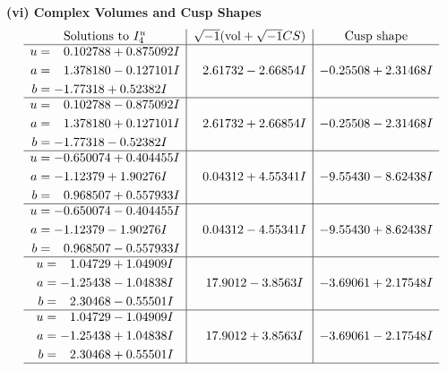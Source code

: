 \documentclass[1p]{elsarticle_modified}
\theoremstyle{definition}
\newcommand{\I}{\sqrt{-1}}
\begin{document}
\newpage\flushleft \textbf{(vi) Complex Volumes and Cusp Shapes}
$$\begin{array}{c|c|c}  
\text{Solutions to }I^u_{4}& \I (\text{vol} + \sqrt{-1}CS) & \text{Cusp shape}\\
 \hline 
\begin{aligned}
u &= \phantom{-}0.102788 + 0.875092 I \\
a &= \phantom{-}1.378180 - 0.127101 I \\
b &= -1.77318 + 0.52382 I\end{aligned}
 & \phantom{-}2.61732 - 2.66854 I & -0.25508 + 2.31468 I \\ \hline\begin{aligned}
u &= \phantom{-}0.102788 - 0.875092 I \\
a &= \phantom{-}1.378180 + 0.127101 I \\
b &= -1.77318 - 0.52382 I\end{aligned}
 & \phantom{-}2.61732 + 2.66854 I & -0.25508 - 2.31468 I \\ \hline\begin{aligned}
u &= -0.650074 + 0.404455 I \\
a &= -1.12379 + 1.90276 I \\
b &= \phantom{-}0.968507 + 0.557933 I\end{aligned}
 & \phantom{-}0.04312 + 4.55341 I & -9.55430 - 8.62438 I \\ \hline\begin{aligned}
u &= -0.650074 - 0.404455 I \\
a &= -1.12379 - 1.90276 I \\
b &= \phantom{-}0.968507 - 0.557933 I\end{aligned}
 & \phantom{-}0.04312 - 4.55341 I & -9.55430 + 8.62438 I \\ \hline\begin{aligned}
u &= \phantom{-}1.04729 + 1.04909 I \\
a &= -1.25438 - 1.04838 I \\
b &= \phantom{-}2.30468 - 0.55501 I\end{aligned}
 & \phantom{-}17.9012 - 3.8563 I & -3.69061 + 2.17548 I \\ \hline\begin{aligned}
u &= \phantom{-}1.04729 - 1.04909 I \\
a &= -1.25438 + 1.04838 I \\
b &= \phantom{-}2.30468 + 0.55501 I\end{aligned}
 & \phantom{-}17.9012 + 3.8563 I & -3.69061 - 2.17548 I\\
 \hline 
 \end{array}$$\newpage\newpage\renewcommand{\arraystretch}{1}
\end{document}
